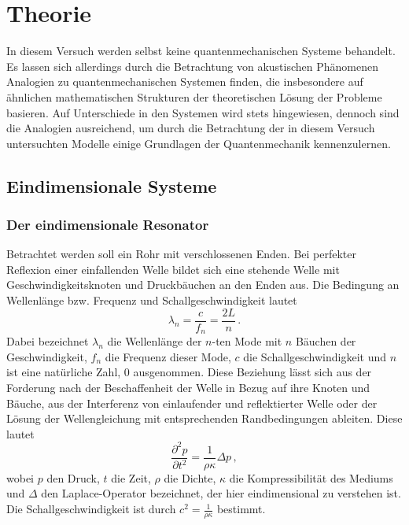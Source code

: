 \section{Theorie}
\label{sec:Theorie}
In diesem Versuch werden selbst keine quantenmechanischen Systeme behandelt. Es lassen sich allerdings durch die Betrachtung von akustischen Phänomenen Analogien zu quantenmechanischen Systemen finden, die insbesondere auf ähnlichen mathematischen Strukturen der theoretischen Lösung der Probleme basieren. Auf Unterschiede in den Systemen wird stets hingewiesen, dennoch sind die Analogien ausreichend, um durch die Betrachtung der in diesem Versuch untersuchten Modelle einige Grundlagen der Quantenmechanik kennenzulernen.
\subsection{Eindimensionale Systeme}
\label{subsec:eindimsyst}
\subsubsection{Der eindimensionale Resonator}
Betrachtet werden soll ein Rohr mit verschlossenen Enden. Bei perfekter Reflexion einer einfallenden Welle bildet sich eine stehende Welle mit Geschwindigkeitsknoten und Druckbäuchen an den Enden aus. Die Bedingung an Wellenlänge bzw. Frequenz und Schallgeschwindigkeit lautet
\begin{equation}
  \lambda_n = \frac{c}{f_n} = \frac{2L}{n}\,.
  \label{eqn:stehendeWelle}
\end{equation}
Dabei bezeichnet $\lambda_n$ die Wellenlänge der $n$-ten Mode mit $n$ Bäuchen der Geschwindigkeit, $f_n$ die Frequenz dieser Mode, $c$ die Schallgeschwindigkeit und $n$ ist eine natürliche Zahl, 0 ausgenommen.
Diese Beziehung lässt sich aus der Forderung nach der Beschaffenheit der Welle in Bezug auf ihre Knoten und Bäuche, aus der Interferenz von einlaufender und reflektierter Welle oder der Lösung der Wellengleichung mit entsprechenden Randbedingungen ableiten. Diese lautet
\begin{equation}
  \frac{\partial^2 p}{\partial t^2} = \frac{1}{\rho \kappa} \Delta p\,,
  \label{eqn:wellengleichung}
\end{equation}
wobei $p$ den Druck, $t$ die Zeit, $\rho$ die Dichte, $\kappa$ die Kompressibilität des Mediums und $\Delta$ den Laplace-Operator bezeichnet, der hier eindimensional zu verstehen ist. Die Schallgeschwindigkeit ist durch $c^2 = \frac{1}{\rho \kappa}$ bestimmt.


